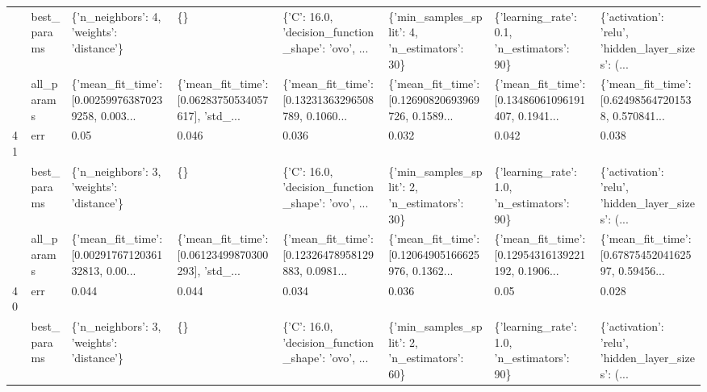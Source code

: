 \begin{tabular}{llllllll}
   & best\_params &          \{'n\_neighbors': 4, 'weights': 'distance'\} &                                                 \{\} &  \{'C': 16.0, 'decision\_function\_shape': 'ovo', ... &       \{'min\_samples\_split': 4, 'n\_estimators': 30\} &         \{'learning\_rate': 0.1, 'n\_estimators': 90\} &  \{'activation': 'relu', 'hidden\_layer\_sizes': (... \\
   & all\_params &  \{'mean\_fit\_time': [0.002599763870239258, 0.003... &  \{'mean\_fit\_time': [0.06283750534057617], 'std\_... &  \{'mean\_fit\_time': [0.13231363296508789, 0.1060... &  \{'mean\_fit\_time': [0.12690820693969726, 0.1589... &  \{'mean\_fit\_time': [0.13486061096191407, 0.1941... &  \{'mean\_fit\_time': [0.624985647201538, 0.570841... \\
41 & err &                                               0.05 &                                              0.046 &                                              0.036 &                                              0.032 &                                              0.042 &                                              0.038 \\
   & best\_params &          \{'n\_neighbors': 3, 'weights': 'distance'\} &                                                 \{\} &  \{'C': 16.0, 'decision\_function\_shape': 'ovo', ... &       \{'min\_samples\_split': 2, 'n\_estimators': 30\} &         \{'learning\_rate': 1.0, 'n\_estimators': 90\} &  \{'activation': 'relu', 'hidden\_layer\_sizes': (... \\
   & all\_params &  \{'mean\_fit\_time': [0.0029176712036132813, 0.00... &  \{'mean\_fit\_time': [0.06123499870300293], 'std\_... &  \{'mean\_fit\_time': [0.12326478958129883, 0.0981... &  \{'mean\_fit\_time': [0.12064905166625976, 0.1362... &  \{'mean\_fit\_time': [0.12954316139221192, 0.1906... &  \{'mean\_fit\_time': [0.6787545204162597, 0.59456... \\
40 & err &                                              0.044 &                                              0.044 &                                              0.034 &                                              0.036 &                                               0.05 &                                              0.028 \\
   & best\_params &          \{'n\_neighbors': 3, 'weights': 'distance'\} &                                                 \{\} &  \{'C': 16.0, 'decision\_function\_shape': 'ovo', ... &       \{'min\_samples\_split': 2, 'n\_estimators': 60\} &         \{'learning\_rate': 1.0, 'n\_estimators': 90\} &  \{'activation': 'relu', 'hidden\_layer\_sizes': (... \\

\end{tabular}

